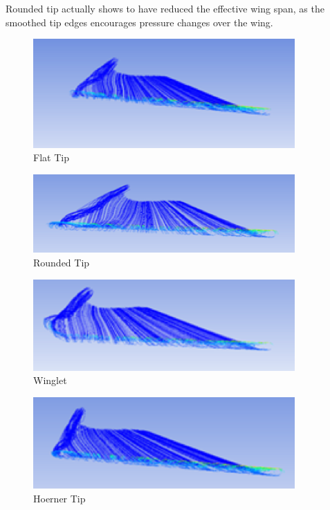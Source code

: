 \documentclass[12pt]{article}
\begin{document}
\noindent Rounded tip actually shows to have reduced the effective wing span, as the smoothed tip edges encourages pressure changes over the wing. \\

\begin{figure}[h]
\includegraphics[width=10cm,scale=1]{flattip.png}
\caption{Flat Tip}
\label{fig:flattip}
\end{figure}

\begin{figure}[h]
\includegraphics[width=10cm, scale=1]{roundtip.png}
\caption{Rounded Tip}
\label{fig:roundtip}
\end{figure}

\begin{figure}[h!]
\includegraphics[width=10cm, scale=1]{winglet.png}
\caption{Winglet}
\label{fig:winglet}
\end{figure}

\begin{figure}[h!]
\includegraphics[width=10cm, scale=1]{hoerener.png}
\caption{Hoerner Tip}
\label{fig:hoerner}
\end{figure}
\end{document}
